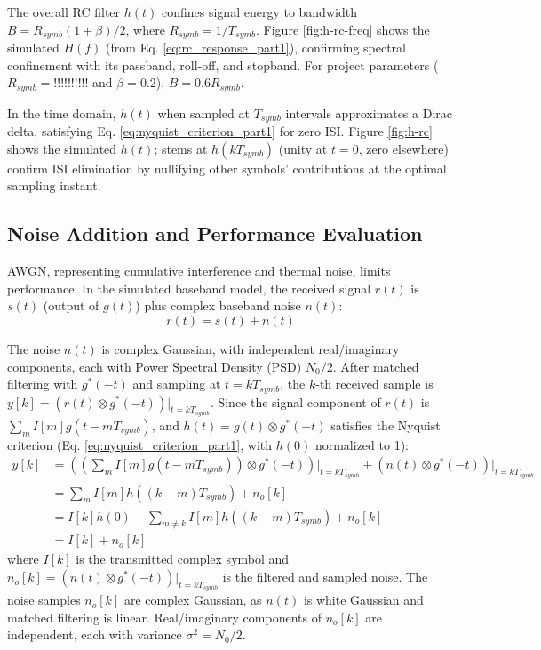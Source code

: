 \documentclass[11pt]{article}
\begin{document}
	The overall RC filter $h(t)$ confines signal energy to bandwidth $B = R_{symb} (1+\beta)/2$, where $R_{symb} = 1/T_{symb}$. Figure \ref{fig:h-rc-freq} shows the simulated $H(f)$ (from Eq. \ref{eq:rc_response_part1}), confirming spectral confinement with its passband, roll-off, and stopband. For project parameters ($R_{symb} = !!!!!!!!!!$ and $\beta = 0.2$), $B = 0.6 R_{symb}$.
	
	In the time domain, $h(t)$ when sampled at $T_{symb}$ intervals approximates a Dirac delta, satisfying Eq. \ref{eq:nyquist_criterion_part1} for zero ISI. Figure \ref{fig:h-rc} shows the simulated $h(t)$; stems at $h(kT_{symb})$ (unity at $t=0$, zero elsewhere) confirm ISI elimination by nullifying other symbols' contributions at the optimal sampling instant.
	
	
	\subsection{Noise Addition and Performance Evaluation}
	AWGN, representing cumulative interference and thermal noise, limits performance. In the simulated baseband model, the received signal $r(t)$ is $s(t)$ (output of $g(t)$) plus complex baseband noise $n(t)$:
	\begin{equation}
		r(t) = s(t) + n(t)
	\end{equation}
	\par
	The noise $n(t)$ is complex Gaussian, with independent real/imaginary components, each with Power Spectral Density (PSD) $N_0/2$. After matched filtering with $g^*(-t)$ and sampling at $t = kT_{symb}$, the $k$-th received sample is $y[k] = (r(t) \otimes g^*(-t))|_{t=kT_{symb}}$. Since the signal component of $r(t)$ is $\sum_m I[m]g(t-mT_{symb})$, and $h(t) = g(t) \otimes g^*(-t)$ satisfies the Nyquist criterion (Eq. \ref{eq:nyquist_criterion_part1}, with $h(0)$ normalized to 1):
	\begin{align}
		y[k] &= \left( \left(\sum_m I[m]g(t-mT_{symb})\right) \otimes g^*(-t) \right)\Big|_{t=kT_{symb}} + (n(t) \otimes g^*(-t))|_{t=kT_{symb}} \nonumber \\
		&= \sum_m I[m]h((k-m)T_{symb}) + n_o[k] \nonumber \\
		&= I[k]h(0) + \sum_{m \neq k} I[m]h((k-m)T_{symb}) + n_o[k] \nonumber \\
		&= I[k] + n_o[k] \label{eq:yk_plus_noise}
	\end{align}
	where $I[k]$ is the transmitted complex symbol and $n_o[k] = (n(t) \otimes g^*(-t))|_{t=kT_{symb}}$ is the filtered and sampled noise. The noise samples $n_o[k]$ are complex Gaussian, as $n(t)$ is white Gaussian and matched filtering is linear. Real/imaginary components of $n_o[k]$ are independent, each with variance $\sigma^2 = N_0/2$.
	
\end{document}
